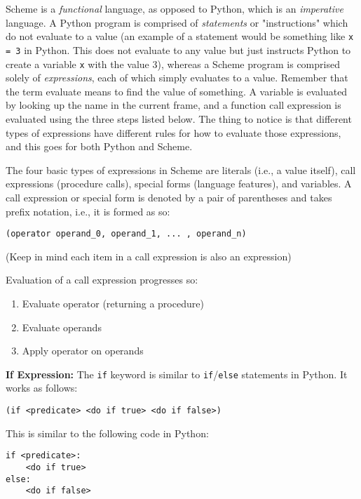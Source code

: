Scheme is a \textit{functional} language, as opposed to Python, which is an \textit{imperative} language. A Python program is comprised of \textit{statements} or "instructions" which do not evaluate to a value (an example of a statement would be something like \lstinline{x = 3} in Python. This does not evaluate to any value but just instructs Python to create a variable \lstinline{x} with the value 3), whereas a Scheme program is comprised solely of \textit{expressions}, each of which simply evaluates to a value. Remember that the term evaluate means to find the value of something. A variable is evaluated by looking up the name in the current frame, and a function call expression is evaluated using the three steps listed below. The thing to notice is that different types of expressions have different rules for how to evaluate those expressions, and this goes for both Python and Scheme. 

The four basic types of expressions in Scheme are literals (i.e., a value itself), call expressions (procedure calls), special forms (language features), and variables.  A call expression or special form is denoted by a pair of parentheses and takes prefix notation, i.e., it is formed as so:
\vspace{0.5mm}
\begin{lstlisting}
(operator operand_0, operand_1, ... , operand_n)
\end{lstlisting}

(Keep in mind each item in a call expression is also an expression)

Evaluation of a call expression progresses so:
\begin{enumerate}
\item Evaluate operator (returning a procedure)
\item Evaluate operands
\item Apply operator on operands
\end{enumerate}

\newpage 

\textbf{If Expression: }
The \lstinline{if} keyword is similar to \lstinline{if}/\lstinline{else} statements in Python. It works as follows:
\begin{lstlisting}
(if <predicate> <do if true> <do if false>)
\end{lstlisting}

This is similar to the following code in Python:
\begin{lstlisting}
if <predicate>:
    <do if true>
else:
    <do if false>
\end{lstlisting}

